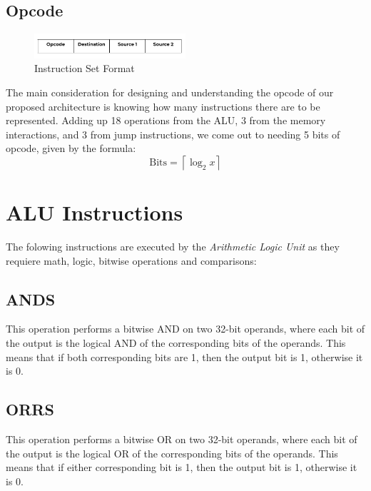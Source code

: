 \documentclass[9pt,a4paper,twoside]{tau}
\begin{document}
        \subsection{Opcode}

        \begin{figure}[h]  %
            \centering  %
            \includegraphics[width=0.5\textwidth]{images/ISA.JPG}
            \caption{Instruction Set Format}
            \label{fig:ISA Format}
        \end{figure}

        The main consideration for designing and understanding the opcode of our proposed architecture is knowing how many instructions there are to be represented. Adding up 18 operations from the ALU, 3 from the memory interactions, and 3 from jump instructions, we come out to needing 5 bits of opcode, given by the formula:
        \begin{equation}
            \text{Bits} = \left\lceil \log_{2}{x} \right\rceil
        \end{equation}
    



        \section{ALU Instructions}

        The folowing instructions are executed by the \textit{Arithmetic Logic Unit} as they requiere math, logic, bitwise operations and comparisons:
    
        \subsection{ANDS}
        This operation performs a bitwise AND on two 32-bit operands, where each bit of the output is the logical AND of the corresponding bits of the operands. This means that if both corresponding bits are 1, then the output bit is 1, otherwise it is 0. 
        \subsection{ORRS}
        This operation performs a bitwise OR on two 32-bit operands, where each bit of the output is the logical OR of the corresponding bits of the operands. This means that if either corresponding bit is 1, then the output bit is 1, otherwise it is 0. 
\end{document}
